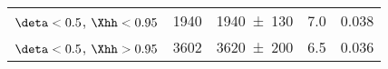 \begin{table}[!tbh]
\begin{tabular}{lSSSS[table-format=4.4,table-number-alignment=center]}
%
%

$\deta<0.5$, $\Xhh<0.95$                  & \num{1940}                     & \num{1940+-130}                        & \num{7.0}                             & 0.038   \\                               %
$\deta<0.5$, $\Xhh>0.95$                  & \num{3602}                     & \num{3620+-200}                        & \num{6.5}                             & 0.036   \\                               %


\end{tabular}
\end{table}
